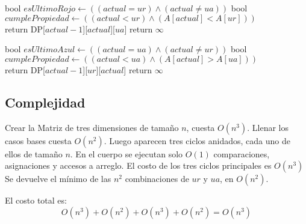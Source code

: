 \begin{algorithm}[H]
\begin{algorithmic}

    \State bool $esUltimoRojo \gets((actual = ur) \land (actual \neq ua))$ 
    \State bool $cumplePropiedad \gets((actual < ur) \land (A[actual] < A[ur]))$  \\

        \State return DP[$actual-1$][$actual$][$ua$]
    \Else
        \State return $\infty$
    \EndIf
\EndProcedure
\end{algorithmic}
\end{algorithm}


\begin{algorithm}[H]
\begin{algorithmic}

    \State bool $esUltimoAzul \gets((actual = ua) \land (actual \neq ur))$ 
    \State bool $cumplePropiedad \gets((actual < ua) \land (A[actual] > A[ua]))$  \\

        \State return DP[$actual-1$][$ur$][$actual$]
    \Else
        \State return $\infty$
    \EndIf
\EndProcedure
\end{algorithmic}
\end{algorithm}


\subsection{Complejidad}

Crear la Matriz de tres dimensiones de tamaño $n$, cuesta $O(n^3)$. Llenar los casos bases cuesta $O(n^2)$.
Luego aparecen tres ciclos anidados, cada uno de ellos de tamaño $n$. En el cuerpo se ejecutan solo $O(1)$ comparaciones, asignaciones y accesos a arreglo. El costo de los tres ciclos principales es $O(n^3)$ 
Se devuelve el mínimo de las $n^2$ combinaciones de $ur$ y $ua$, en $O(n^2)$. 

El costo total es: 
$$O(n^3) + O(n^2) + O(n^3) + O(n^2) = O(n^3)$$